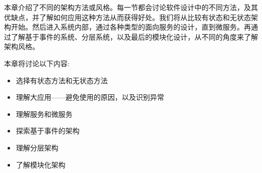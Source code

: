 本章介绍了不同的架构方法或风格。每一节都会讨论软件设计中的不同方法，及其优缺点，并了解如何应用这种方法从而获得好处。我们将从比较有状态和无状态架构开始。然后进入系统内部，通过各种类型的面向服务的设计，直到微服务。再通过了解基于事件的系统、分层系统，以及最后的模块化设计，从不同的角度来了解架构风格。


本章将讨论以下内容:

\begin{itemize}
\item 选择有状态方法和无状态方法
\item 理解大应用——避免使用的原因，以及识别异常
\item 理解服务和微服务
\item 探索基于事件的架构
\item 理解分层架构
\item 了解模块化架构

\end{itemize}